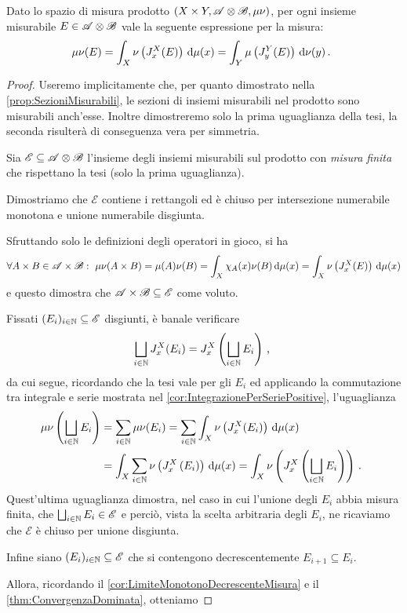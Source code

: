 \begin{proposition}\label{prop:PreTonelli}
	Dato lo spazio di misura prodotto $(X\times Y,\mathscr A\otimes\mathscr B,\mu\nu)$, per ogni insieme misurabile $E\in\mathscr A\otimes\mathscr B$ \sigfin[o] vale la seguente espressione per la misura:
	\begin{equation*}
		\mu\nu(E)=\int_X\nu\left(J_x^X(E)\right)\,\mathrm d\mu(x)=\int_Y\mu\left(J_y^Y(E)\right)\,\mathrm d\nu(y)\, \text{. }
	\end{equation*}
\end{proposition}
\begin{proof}
	\newcommand{\E}{\ensuremath{\mathscr E}}
	Useremo implicitamente che, per quanto dimostrato nella \cref{prop:SezioniMisurabili}, le sezioni di insiemi misurabili nel prodotto sono misurabili anch'esse.
	Inoltre dimostreremo solo la prima uguaglianza della tesi, la seconda risulterà di conseguenza vera per simmetria.
	
	Sia $\E\subseteq \A\otimes\B$ l'insieme degli insiemi misurabili sul prodotto con \emph{misura finita} che rispettano la tesi (solo la prima uguaglianza).
	
	Dimostriamo che $\E$ contiene i rettangoli ed è chiuso per intersezione numerabile monotona e unione numerabile disgiunta.
	
	Sfruttando solo le definizioni degli operatori in gioco, si ha
	\begin{equation*}
		\forall A\times B\in\mathscr A\times\mathscr B:\ \mu\nu(A\times B)=\mu(A)\nu(B)=\int_X \chi_A(x)\nu(B)\,\mathrm d\mu(x)=\int_X\nu\left(J_x^X(E)\right)\,\mathrm d\mu(x)
	\end{equation*}
	e questo dimostra che $\A\times\B\subseteq \E$ come voluto.
	
	Fissati $(E_i)_{i\in\N}\subseteq \E$ disgiunti, è banale verificare
	\begin{equation*}
		\bigsqcup_{i\in\mathbb N}J_x^X(E_i)=J_x^X\left(\bigsqcup_{i\in\mathbb N}E_i\right)\, \text{, }
	\end{equation*}
	da cui segue, ricordando che la tesi vale per gli $E_i$ ed applicando la commutazione tra integrale e serie mostrata nel \cref{cor:IntegrazionePerSeriePositive}, l'uguaglianza
	\begin{align*}
		\mu\nu\left(\bigsqcup_{i\in\mathbb N}E_i\right)&=\sum_{i\in\mathbb N}\mu\nu(E_i)=\sum_{i\in\mathbb N}\int_X \nu\left(J_x^X(E_i)\right)\,\mathrm d\mu(x)\\
		&=\int_X\sum_{i\in\mathbb N}\nu\left(J_x^X\left(E_i\right)\right)\,\mathrm d\mu(x)=\int_X\nu\left(J_x^X\left(\bigsqcup_{i\in\mathbb N}E_i\right)\right)\, \text{. }
	\end{align*}
	Quest'ultima uguaglianza dimostra, nel caso in cui l'unione degli $E_i$ abbia misura finita, che $\bigsqcup_{i\in\N}E_i\in\E$ e perciò, vista la scelta arbitraria degli $E_i$, ne ricaviamo che $\E$ è chiuso per unione disgiunta.
	
	Infine siano $(E_i)_{i\in\N}\subseteq \E$ che si contengono decrescentemente $E_{i+1}\subseteq E_i$.
	
	Allora, ricordando il \cref{cor:LimiteMonotonoDecrescenteMisura} e il \cref{thm:ConvergenzaDominata}, otteniamo
	
	
\end{proof}

